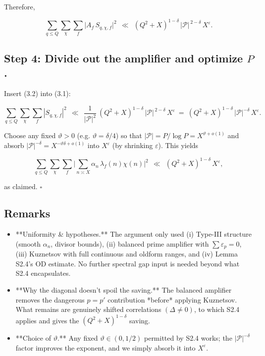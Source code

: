 \documentclass[11pt]{article}
\theoremstyle{definition}
\theoremstyle{remark}
\begin{document}
Therefore,

\begin{equation}
\sum_{q\le Q}\sum_{\chi}\sum_f \big|A_f\,S_{q,\chi,f}\big|^2
\ \ \ll\ \ (Q^2+X)^{1-\delta}\,|\mathcal P|^{\,2-\delta}\,X^{\varepsilon}.
\tag{3.2}
\end{equation}


\subsection*{Step 4: Divide out the amplifier and optimize $P$.}
Insert (3.2) into (3.1):

$$
\sum_{q\le Q}\sum_{\chi}\sum_f |S_{q,\chi,f}|^2
\ \ \ll\ \ \frac{1}{|\mathcal P|^2}\ (Q^2+X)^{1-\delta}\,|\mathcal P|^{\,2-\delta}\,X^{\varepsilon}
\ =\ (Q^2+X)^{1-\delta}\,|\mathcal P|^{-\delta}\,X^{\varepsilon}.
$$

Choose any fixed $\vartheta>0$ (e.g. $\vartheta=\delta/4$) so that $|\mathcal P|=P/\log P=X^{\vartheta+o(1)}$ and absorb $|\mathcal P|^{-\delta}=X^{-\vartheta\delta+o(1)}$ into $X^{\varepsilon}$ (by shrinking $\varepsilon$). This yields

$$
\sum_{q\le Q}\sum_{\chi}\sum_f \Big|\sum_{n\asymp X}\alpha_n\,\lambda_f(n)\chi(n)\Big|^2
\ \ \ll\ \ (Q^2+X)^{1-\delta}\,X^{\varepsilon},
$$

as claimed. $\square$

\subsection*{Remarks}

\begin{itemize}
\item **Uniformity \& hypotheses.** The argument only used (i) Type-III structure (smooth $\alpha_n$, divisor bounds), (ii) balanced prime amplifier with $\sum \varepsilon_p=0$, (iii) Kuznetsov with full continuous and oldform ranges, and (iv) Lemma S2.4’s OD estimate. No further spectral gap input is needed beyond what S2.4 encapsulates.

\item **Why the diagonal doesn’t spoil the saving.** The balanced amplifier removes the dangerous $p=p'$ contribution *before* applying Kuznetsov. What remains are genuinely shifted correlations $(\Delta\neq 0)$, to which S2.4 applies and gives the $(Q^2+X)^{1-\delta}$ saving.

\item **Choice of $\vartheta$.** Any fixed $\vartheta\in(0,1/2)$ permitted by S2.4 works; the $|\mathcal P|^{-\delta}$ factor improves the exponent, and we simply absorb it into $X^{\varepsilon}$.
\end{itemize}
\end{document}
